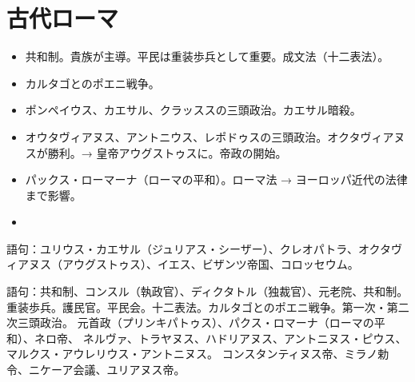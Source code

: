 \documentclass[twocolumn,autodetect-engine,dvipdfmx-if-dvi,ja=standard]{jsarticle} \usepackage{mystyle}
\begin{document}
\section{古代ローマ}


\begin{itemize}
\item 共和制。貴族が主導。平民は重装歩兵として重要。成文法（十二表法）。
\item カルタゴとのポエニ戦争。
\item ポンペイウス、カエサル、クラッススの三頭政治。カエサル暗殺。
\item オウタヴィアヌス、アントニウス、レポドゥスの三頭政治。オクタヴィアヌスが勝利。→ 皇帝アウグストゥスに。帝政の開始。
  
\item パックス・ローマーナ（ローマの平和）。ローマ法 → ヨーロッパ近代の法律まで影響。
\item 
\end{itemize}

語句：ユリウス・カエサル（ジュリアス・シーザー）、クレオパトラ、オクタヴィアヌス（アウグストゥス）、イエス、ビザンツ帝国、コロッセウム。

語句：共和制、コンスル（執政官）、ディクタトル（独裁官）、元老院、共和制。
重装歩兵。護民官。平民会。十二表法。カルタゴとのポエニ戦争。第一次・第二次三頭政治。
元首政（プリンキパトゥス）、パクス・ロマーナ（ローマの平和）、ネロ帝、
ネルヴァ、トラヤヌス、ハドリアヌス、アントニヌス・ピウス、マルクス・アウレリウス・アントニヌス。
コンスタンティヌス帝、ミラノ勅令、ニケーア会議、ユリアヌス帝。
\end{document}
